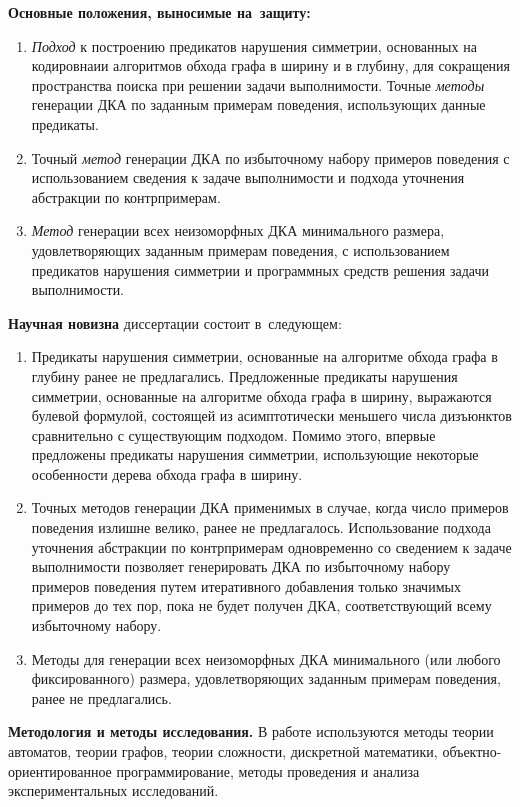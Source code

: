 \textbf{Основные положения, выносимые на~защиту:}
\begin{enumerate}
  \item \emph{Подход} к построению предикатов нарушения симметрии, основанных на кодировнаии алгоритмов обхода графа в ширину и в глубину, для сокращения пространства поиска при решении задачи выполнимости.
  Точные \emph{методы} генерации ДКА по заданным примерам поведения, использующих данные предикаты.
  
  \item Точный \emph{метод} генерации ДКА по избыточному набору примеров поведения с использованием сведения к задаче выполнимости и подхода уточнения абстракции по контрпримерам.

  \item \emph{Метод} генерации всех неизоморфных ДКА минимального размера, удовлетворяющих заданным примерам поведения, с использованием предикатов нарушения симметрии и программных средств решения задачи выполнимости.
\end{enumerate}

\textbf{Научная новизна} диссертации состоит в~следующем:
\begin{enumerate}
  \item Предикаты нарушения симметрии, основанные на алгоритме обхода графа в глубину ранее не предлагались.
  Предложенные предикаты нарушения симметрии, основанные на алгоритме обхода графа в ширину, выражаются булевой формулой, состоящей из асимптотически меньшего числа дизъюнктов сравнительно с существующим подходом.
  Помимо этого, впервые предложены предикаты нарушения симметрии, использующие некоторые особенности дерева обхода графа в ширину.

  \item Точных методов генерации ДКА применимых в случае, когда число примеров поведения излишне велико, ранее не предлагалось.
  Использование подхода уточнения абстракции по контрпримерам одновременно со сведением к задаче выполнимости позволяет генерировать ДКА по избыточному набору примеров поведения путем итеративного добавления только значимых примеров до тех пор, пока не будет получен ДКА, соответствующий всему избыточному набору.

  \item Методы для генерации всех неизоморфных ДКА минимального (или любого фиксированного) размера, удовлетворяющих заданным примерам поведения, ранее не предлагались.
\end{enumerate}

\textbf{Методология и методы исследования.} В работе используются методы теории автоматов, теории графов, теории сложности, дискретной математики, объектно-ориентированное программирование, методы проведения и анализа экспериментальных исследований.


